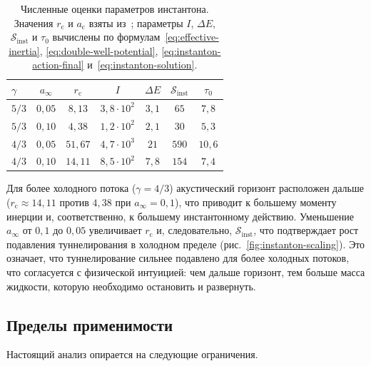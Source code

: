 \documentclass[12pt,a4paper,preprint]{elsarticle}
\begin{document}
            \begin{table}[htb]
                \centering
                \caption{Численные оценки параметров инстантона. Значения $r_{\mathrm{c}}$ и $a_{\mathrm{c}}$ взяты из~\cite{SemyannikovAV_AcousticGeometryAndSoundRayDynamicsInRelativisticSphericalAccretion_2026}; параметры $I$, $\Delta E$, $\mathcal{S}_{\mathrm{inst}}$ и $\tau_{0}$ вычислены по формулам~\eqref{eq:effective-inertia}, \eqref{eq:double-well-potential}, \eqref{eq:instanton-action-final} и~\eqref{eq:instanton-solution}.}
                \label{tab:instanton-parameters}
                \small
                \begin{tabular}{lcccccc}
                    \toprule
                    $\gamma$ & $a_{\infty}$ & $r_{\mathrm{c}}$ & $I$ & $\Delta E$ & $\mathcal{S}_{\mathrm{inst}}$ & $\tau_{0}$ \\
                    \midrule
                    $5/3$ & $0{,}05$ & $8{,}13$ & $3{,}8 \cdot 10^{2}$ & $3{,}1$ & $65$ & $7{,}8$ \\
                    $5/3$ & $0{,}10$ & $4{,}38$ & $1{,}2 \cdot 10^{2}$ & $2{,}1$ & $30$ & $5{,}3$ \\
                    \midrule
                    $4/3$ & $0{,}05$ & $51{,}67$ & $4{,}7 \cdot 10^{3}$ & $21$ & $590$ & $10{,}6$ \\
                    $4/3$ & $0{,}10$ & $14{,}11$ & $8{,}5 \cdot 10^{2}$ & $7{,}8$ & $154$ & $7{,}4$ \\
                    \bottomrule
                \end{tabular}
            \end{table}
            
            Для более холодного потока ($\gamma = 4/3$) акустический горизонт расположен дальше ($r_{\mathrm{c}} \approx 14{,}11$ против $4{,}38$ при $a_{\infty} = 0{,}1$), что приводит к большему моменту инерции и, соответственно, к большему инстантонному действию. Уменьшение $a_{\infty}$ от $0{,}1$ до $0{,}05$ увеличивает $r_{\mathrm{c}}$ и, следовательно, $\mathcal{S}_{\mathrm{inst}}$, что подтверждает рост подавления туннелирования в холодном пределе (рис.~\ref{fig:instanton-scaling}). Это означает, что туннелирование сильнее подавлено для более холодных потоков, что согласуется с физической интуицией: чем дальше горизонт, тем больше масса жидкости, которую необходимо остановить и развернуть.

        \subsection{Пределы применимости}\label{subsec:limitations}
            Настоящий анализ опирается на следующие ограничения.
            
\end{document}
